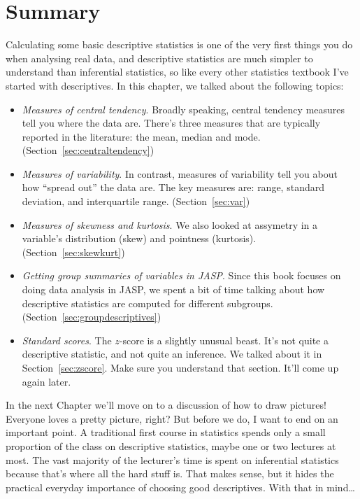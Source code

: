 \section{Summary}

Calculating some basic descriptive statistics is one of the very first things you do when analysing real data, and descriptive statistics are much simpler to understand than inferential statistics, so like every other statistics textbook I've started with descriptives. In this chapter, we talked about the following topics:

\begin{itemize}
\item {\it Measures of central tendency}. Broadly speaking, central tendency measures tell you where the data are. There's three measures that are typically reported in the literature: the mean, median and mode. (Section~\ref{sec:centraltendency})
\item {\it Measures of variability}. In contrast, measures of variability tell you about how ``spread out'' the data are. The key measures are: range, standard deviation, and interquartile range. (Section~\ref{sec:var})
\item {\it Measures of skewness and kurtosis}. We also looked at assymetry in a variable's distribution (skew) and pointness (kurtosis). (Section~\ref{sec:skewkurt})
\item {\it Getting group summaries of variables in JASP}. Since this book focuses on doing data analysis in JASP, we spent a bit of time talking about how descriptive statistics are computed for different subgroups. (Section~\ref{sec:groupdescriptives})
\item {\it Standard scores}. The $z$-score is a slightly unusual beast. It's not quite a descriptive statistic, and not quite an inference. We talked about it in Section~\ref{sec:zscore}. Make sure you understand that section. It'll come up again later. 
\end{itemize}
In the next Chapter we'll move on to a discussion of how to draw pictures! Everyone loves a pretty picture, right? But before we do, I want to end on an important point. A traditional first course in statistics spends only a small proportion of the class on descriptive statistics, maybe one or two lectures at most. The vast majority of the lecturer's time is spent on inferential statistics because that's where all the hard stuff is. That makes sense, but it hides the practical everyday importance of choosing good descriptives. With that in mind\ldots

